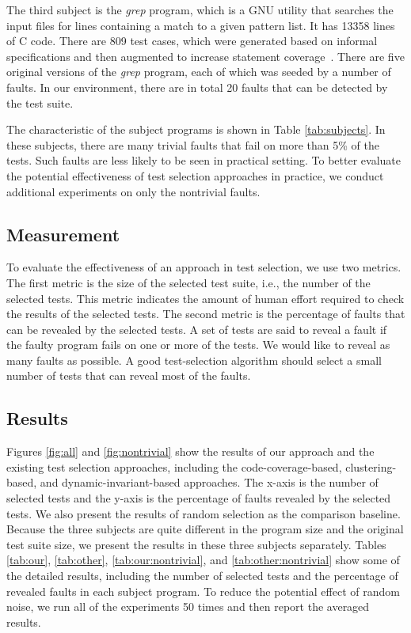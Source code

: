 \documentclass{sig-alternate}
\begin{document}
The third subject is the \emph{grep} program, which is a GNU utility
that searches the input files for lines containing a match to a
given pattern list. It has 13358 lines of C code. There are 809 test
cases, which were generated based on informal specifications and
then augmented to increase statement coverage~\cite{SIR}. There are
five original versions of the \emph{grep} program, each of which was
seeded by a number of faults. In our environment, there are in total
20 faults that can be detected by the test suite.


The characteristic of the subject programs is shown in Table
\ref{tab:subjects}. In these subjects, there are many trivial faults
that fail on more than 5\% of the tests. Such faults are less likely
to be seen in practical setting. To better evaluate the potential
effectiveness of test selection approaches in practice, we conduct
additional experiments on only the nontrivial faults.




\subsection{Measurement}



To evaluate the effectiveness of an approach in test selection, we
use two metrics. The first metric is the size of the selected test
suite, i.e., the number of the selected tests. This metric indicates
the amount of human effort required to check the results of the
selected tests. The second metric is the percentage of faults that
can be revealed by the selected tests. A set of tests are said to
reveal a fault if the faulty program fails on one or more of the
tests. We would like to reveal as many faults as possible. A good
test-selection algorithm should select a small number of tests that
can reveal most of the faults.



\subsection{Results}



Figures \ref{fig:all} and \ref{fig:nontrivial} show the results of
our approach and the existing test selection approaches, including
the code-coverage-based, clustering-based, and
dynamic-invariant-based approaches. The x-axis is the number of
selected tests and the y-axis is the percentage of faults revealed
by the selected tests. We also present the results of random
selection as the comparison baseline. Because the three subjects are
quite different in the program size and the original test suite
size, we present the results in these three subjects separately.
Tables \ref{tab:our}, \ref{tab:other}, \ref{tab:our:nontrivial}, and
\ref{tab:other:nontrivial} show some of the detailed results,
including the number of selected tests and the percentage of
revealed faults in each subject program. To reduce the potential
effect of random noise, we run all of the experiments 50 times and
then report the averaged results.
\end{document}

